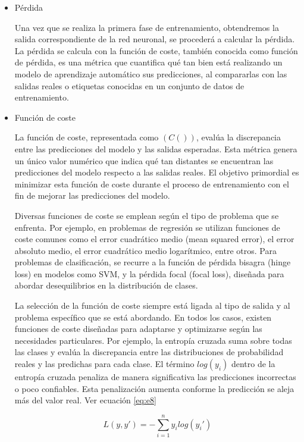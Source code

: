 \begin{itemize}
	\item Pérdida
	
Una vez que se realiza la primera fase de entrenamiento, obtendremos  la salida correspondiente de la red neuronal, se procederá a calcular la pérdida. La pérdida se calcula con la función de coste, también conocida como función de pérdida, es una métrica que cuantifica qué tan bien está realizando un modelo de aprendizaje automático sus predicciones, al compararlas con las salidas reales o etiquetas conocidas en un conjunto de datos de entrenamiento. 
	\item Función de coste
	
La función de coste, representada como $(C())$, evalúa la discrepancia entre las predicciones del modelo y las salidas esperadas. Esta métrica genera un único valor numérico que indica qué tan distantes se encuentran las predicciones del modelo respecto a las salidas reales. El objetivo primordial es minimizar esta función de coste durante el proceso de entrenamiento con el fin de mejorar las predicciones del modelo.
	
Diversas funciones de coste se emplean según el tipo de problema que se enfrenta. Por ejemplo, en problemas de regresión se utilizan funciones de coste comunes como el error cuadrático medio (mean squared error), el error absoluto medio, el error cuadrático medio logarítmico, entre otros. Para problemas de clasificación, se recurre a la función de pérdida bisagra (hinge loss) en modelos como SVM, y la pérdida focal (focal loss), diseñada para abordar desequilibrios en la distribución de clases.

La selección de la función de coste siempre está ligada al tipo de salida y al problema específico que se está abordando. En todos los casos, existen funciones de coste diseñadas para adaptarse y optimizarse según las necesidades particulares. Por ejemplo, la entropía cruzada suma sobre todas las clases y evalúa la discrepancia entre las distribuciones de probabilidad reales y las predichas para cada clase.
El término $log(y_{i})$ dentro de la entropía cruzada penaliza de manera significativa las predicciones incorrectas o poco confiables. Esta penalización aumenta conforme la predicción se aleja más del valor real. Ver ecuación \ref{eq:e8}

\begin{equation} \label{eq:e8} 
	L(y,{y}')=-\displaystyle\sum_{i=1}^{n}y_{i}log(y_{i}')
\end{equation}



\end{itemize}
